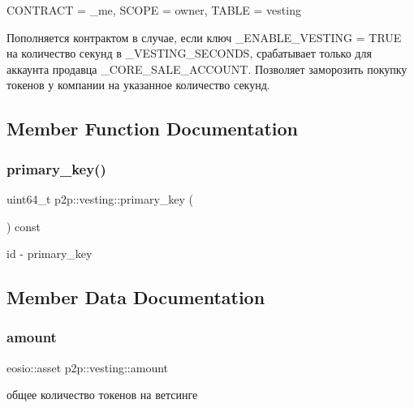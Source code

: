 C\+O\+N\+T\+R\+A\+CT = \+\_\+me, S\+C\+O\+PE = owner, T\+A\+B\+LE = vesting

Пополняется контрактом в случае, если ключ \+\_\+\+E\+N\+A\+B\+L\+E\+\_\+\+V\+E\+S\+T\+I\+NG = T\+R\+UE на количество секунд в \+\_\+\+V\+E\+S\+T\+I\+N\+G\+\_\+\+S\+E\+C\+O\+N\+DS, срабатывает только для аккаунта продавца \+\_\+\+C\+O\+R\+E\+\_\+\+S\+A\+L\+E\+\_\+\+A\+C\+C\+O\+U\+NT. Позволяет заморозить покупку токенов у компании на указанное количество секунд. 

\subsection{Member Function Documentation}
\mbox{\label{structp2p_1_1vesting_a816764ab2ece434f3569aa4210d7442f}} 
\subsubsection{\texorpdfstring{primary\+\_\+key()}{primary\_key()}}
{\footnotesize\ttfamily uint64\+\_\+t p2p\+::vesting\+::primary\+\_\+key (\begin{DoxyParamCaption}{ }\end{DoxyParamCaption}) const\hspace{0.3cm}{\ttfamily [inline]}}

id -\/ primary\+\_\+key 

\subsection{Member Data Documentation}
\mbox{\label{structp2p_1_1vesting_a5a06c08d24cb3f9b929bc4285dd51179}} 
\subsubsection{\texorpdfstring{amount}{amount}}
{\footnotesize\ttfamily eosio\+::asset p2p\+::vesting\+::amount}

общее количество токенов на ветсинге \mbox{\label{structp2p_1_1vesting_a3759f66455f668a402c365554ad6550d}} 
